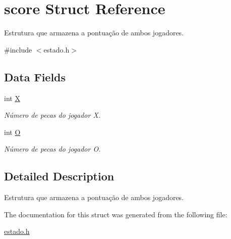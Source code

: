 \hypertarget{structscore}{}\section{score Struct Reference}
\label{structscore}


Estrutura que armazena a pontuação de ambos jogadores.  




{\ttfamily \#include $<$estado.\+h$>$}

\subsection*{Data Fields}
\begin{DoxyCompactItemize}
\item 
\mbox{\label{structscore_a80c0944640e62d3ed6c5419c1bcc0c88}} 
int \hyperlink{structscore_a80c0944640e62d3ed6c5419c1bcc0c88}{X}
\begin{DoxyCompactList}\small\item\em Número de pecas do jogador X. \end{DoxyCompactList}\item 
\mbox{\label{structscore_a07e77f432d8fba85cbeb95faeaa29936}} 
int \hyperlink{structscore_a07e77f432d8fba85cbeb95faeaa29936}{O}
\begin{DoxyCompactList}\small\item\em Número de pecas do jogador O. \end{DoxyCompactList}\end{DoxyCompactItemize}


\subsection{Detailed Description}
Estrutura que armazena a pontuação de ambos jogadores. 

The documentation for this struct was generated from the following file\+:\begin{DoxyCompactItemize}
\item 
\hyperlink{estado_8h}{estado.\+h}\end{DoxyCompactItemize}
